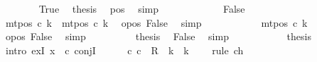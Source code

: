 \begin{isabellebody}
\ \ \ \ \ \ \isamarkupfalse%
\ True\ \isamarkupfalse%
\ {\isacharquery}{\kern0pt}thesis\ \isamarkupfalse%
\ pos{}\ \isamarkupfalse%
\ simp\isanewline
\ \ \ \ \isamarkupfalse%
\isanewline
\ \ \ \ \ \ \isamarkupfalse%
\ False\isanewline
\ \ \ \ \ \ \isamarkupfalse%
\ {\isachardoublequoteopen}mt{\isacharunderscore}{\kern0pt}pos\ c{}\ k{\isacharprime}{\kern0pt}\ {\isacharequal}{\kern0pt}\ mt{\isacharunderscore}{\kern0pt}pos\ c{}\ k{\isacharprime}{\kern0pt}{\isachardoublequoteclose}\ \isamarkupfalse%
\ opos{}\ False\ \isamarkupfalse%
\ simp\isanewline
\ \ \ \ \ \ \isamarkupfalse%
\ \isamarkupfalse%
\ {\isachardoublequoteopen}{\isasymdots}\ {\isacharequal}{\kern0pt}\ mt{\isacharunderscore}{\kern0pt}pos\ c{\isacharprime}{\kern0pt}\ k{\isacharprime}{\kern0pt}{\isachardoublequoteclose}\ \isamarkupfalse%
\ opos{}\ False\ \isamarkupfalse%
\ simp\isanewline
\ \ \ \ \ \ \isamarkupfalse%
\ \isamarkupfalse%
\ {\isacharquery}{\kern0pt}thesis\ \isamarkupfalse%
\ False\ \isamarkupfalse%
\ simp\isanewline
\ \ \ \ \isamarkupfalse%
\isanewline
\ \ \isamarkupfalse%
\isanewline
\ \ \isamarkupfalse%
\ {\isacharquery}{\kern0pt}thesis\isanewline
\ \ \isamarkupfalse%
\ {\isacharparenleft}{\kern0pt}intro\ exI{\isacharbrackleft}{\kern0pt}\ x\ {\isacharequal}{\kern0pt}\ c{}{\isacharbrackright}{\kern0pt}\ conjI{\isacharparenright}{\kern0pt}\isanewline
\ \ \ \ \isamarkupfalse%
\ {\isachardoublequoteopen}{\isacharparenleft}{\kern0pt}c{\isacharprime}{\kern0pt}{\isacharcomma}{\kern0pt}\ c{}{\isacharparenright}{\kern0pt}\ {\isasymin}\ {\isacharquery}{\kern0pt}R\ {\isacharcircum}{\kern0pt}{\isacharcircum}{\kern0pt}\ {\isacharparenleft}{\kern0pt}{\isacharquery}{\kern0pt}k\ {\isacharplus}{\kern0pt}\ {\isacharparenleft}{\kern0pt}{\isacharquery}{\kern0pt}k\ {\isacharminus}{\kern0pt}\ {}{\isacharparenright}{\kern0pt}{\isacharparenright}{\kern0pt}{\isachardoublequoteclose}\ \isamarkupfalse%
\ {\isacharparenleft}{\kern0pt}rule\ ch{}{}{\isacharparenright}{\kern0pt}\isanewline
\ \ \ \ \isamarkupfalse%

\end{isabellebody}

